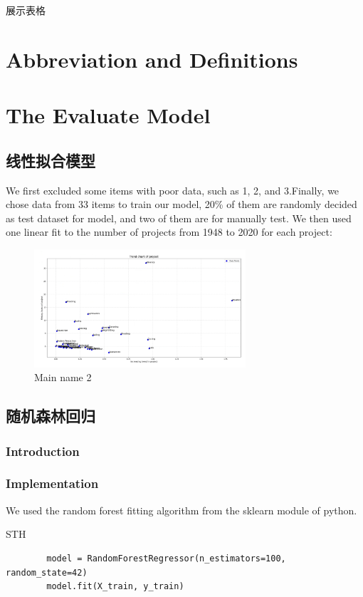 \documentclass[a4paper]{article}
\begin{document}
展示表格

\section{Abbreviation and Definitions}
\section{The Evaluate Model}
\subsection{线性拟合模型}
We first excluded some items with poor data, such as 1, 2, and 3.Finally, we chose data from 33 items to train our model, 20\% of them are randomly decided as test dataset for model, and two of them are for manually test.
We then used one linear fit to the number of projects from 1948 to 2020 for each project:
\captionsetup[listing]{labelformat=empty}
\begin{figure}[H] %
    \centering %
    \includegraphics[width=0.7\textwidth]{TrendChartOfProject} %
    \caption{Main name 2} %
    \label{Fig.main2} %
    \end{figure}

\subsection{随机森林回归}
\subsubsection{Introduction}


\subsubsection{Implementation}
We used the random forest fitting algorithm from the sklearn module of python.
\begin{listing}[htb]\caption{STH}\label{code:processdweet}
    \begin{verbatim}
        model = RandomForestRegressor(n_estimators=100, random_state=42)
        model.fit(X_train, y_train)
\end{verbatim} 
\end{listing}
\end{document}
